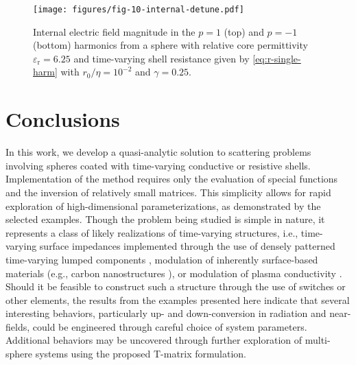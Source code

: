 \documentclass[article]{IEEEtran}
\newcommand{\T}[1]{\mathrm{#1}}
\begin{document}
\begin{figure}
    \centering
    \texttt{[image: figures/fig-10-internal-detune.pdf]}
    \caption{Internal electric field magnitude in the $p=1$ (top) and $p=-1$ (bottom) harmonics from a sphere with relative core permittivity $\varepsilon_\T{r}=6.25$ and time-varying shell resistance given by \eqref{eq:r-single-harm} with $r_0 /\eta = 10^{-2}$ and $\gamma = 0.25$.}
    \label{fig:detuning-resonant}
\end{figure}

\section{Conclusions}

In this work, we develop a quasi-analytic solution to scattering problems involving spheres coated with time-varying conductive or resistive shells.  Implementation of the method requires only the evaluation of special functions and the inversion of relatively small matrices. This simplicity allows for rapid exploration of high-dimensional parameterizations, as demonstrated by the selected examples.  Though the problem being studied is simple in nature, it represents a class of likely realizations of time-varying structures, i.e., time-varying surface impedances implemented through the use of densely patterned time-varying lumped components \cite{wu2019serrodyne,taravati2020space}, modulation of inherently surface-based materials (e.g., carbon nanostructures \cite{salary2018electrically}), or modulation of plasma conductivity \cite{singletary2021}.  Should it be feasible to construct such a structure through the use of switches or other elements, the results from the examples presented here indicate that several interesting behaviors, particularly up- and down-conversion in radiation and near-fields, could be engineered through careful choice of system parameters.  Additional behaviors may be uncovered through further exploration of multi-sphere systems using the proposed T-matrix formulation.
\end{document}
